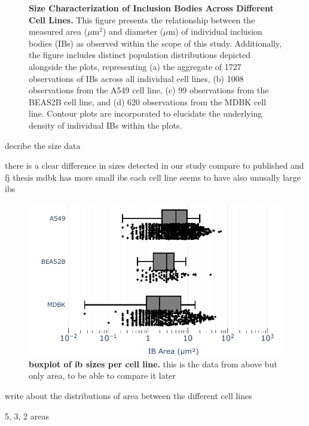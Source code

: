 \begin{figure}
    \caption[Size Characterization of Inclusion Bodies Across Different Cell Lines.]{\textbf{Size Characterization of Inclusion Bodies Across Different Cell Lines.} This figure presents the relationship between the measured area (\(\mu \mbox{m}^2\)) and diameter (\(\mu \mbox{m}\)) of individual inclusion bodies (IBs) as observed within the scope of this study. Additionally, the figure includes distinct population distributions depicted alongside the plots, representing (a) the aggregate of 1727 observations of IBs across all individual cell lines, (b) 1008 observations from the A549 cell line, (c) 99 observations from the BEAS2B cell line, and (d) 620 observations from the MDBK cell line. Contour plots are incorporated to elucidate the underlying density of individual IBs within the plots.}
    \label{fig:Size Characterization of Inclusion Bodies Across Different Cell Lines}  
\end{figure}

decribe the size data

there is a clear difference in sizes detected in our study
compare to published and fj thesis
mdbk has more small ibs
each cell line seems to have also unusally large ibs


\begin{figure}
    \centering
    \includegraphics[width=1\linewidth]{08. Chapter 3/Figs/01. Localisation introduction/06. box-infection.pdf}
    \caption[boxplot of ib sizes per cell line.]{\textbf{boxplot of ib sizes per cell line.} this is the data from above but only area, to be able to compare it later}
    \label{fig:boxplot of ib sizes per cell line}
\end{figure}

write about the distributions of area between the different cell lines

5, 3, 2 areas